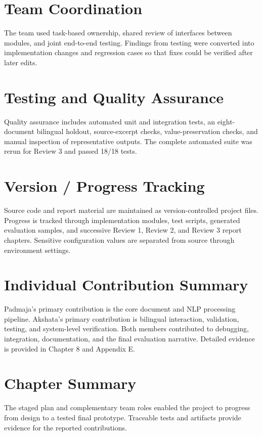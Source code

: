 \section{Team Coordination}
The team used task-based ownership, shared review of interfaces between modules, and joint end-to-end testing. Findings from testing were converted into implementation changes and regression cases so that fixes could be verified after later edits.

\section{Testing and Quality Assurance}
Quality assurance includes automated unit and integration tests, an eight-document bilingual holdout, source-excerpt checks, value-preservation checks, and manual inspection of representative outputs. The complete automated suite was rerun for Review 3 and passed 18/18 tests.

\section{Version / Progress Tracking}
Source code and report material are maintained as version-controlled project files. Progress is tracked through implementation modules, test scripts, generated evaluation samples, and successive Review 1, Review 2, and Review 3 report chapters. Sensitive configuration values are separated from source through environment settings.

\section{Individual Contribution Summary}
Padmaja's primary contribution is the core document and NLP processing pipeline. Akshata's primary contribution is bilingual interaction, validation, testing, and system-level verification. Both members contributed to debugging, integration, documentation, and the final evaluation narrative. Detailed evidence is provided in Chapter 8 and Appendix E.

\section*{Chapter Summary}
The staged plan and complementary team roles enabled the project to progress from design to a tested final prototype. Traceable tests and artifacts provide evidence for the reported contributions.
